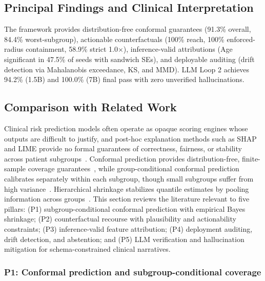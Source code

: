 \documentclass[11pt,a4paper]{article}
\theoremstyle{plain}
\begin{document}
\subsection{Principal Findings and Clinical Interpretation}
The framework provides distribution-free conformal guarantees (91.3\% overall, 84.4\% worst-subgroup), actionable counterfactuals (100\% reach, 100\% enforced-radius containment, 58.9\% strict 1.0$\times$), inference-valid attributions (Age significant in 47.5\% of seeds with sandwich SEs), and deployable auditing (drift detection via Mahalanobis exceedance, KS, and MMD). LLM Loop 2 achieves 94.2\% (1.5B) and 100.0\% (7B) final pass with zero unverified hallucinations.

\subsection{Comparison with Related Work}
\label{sec:related_work}

Clinical risk prediction models often operate as opaque scoring engines whose outputs are difficult to justify, and post-hoc explanation methods such as SHAP and LIME provide no formal guarantees of correctness, fairness, or stability across patient subgroups~\cite{wachter2017counterfactual, lundberg2017unified}. Conformal prediction provides distribution-free, finite-sample coverage guarantees~\cite{vovk2005algorithmic, shafer2008tutorial}, while group-conditional conformal prediction calibrates separately within each subgroup, though small subgroups suffer from high variance~\cite{lei2018distribution, melki2023group}. Hierarchical shrinkage stabilizes quantile estimates by pooling information across groups~\cite{dunn2023distribution}. This section reviews the literature relevant to five pillars: (P1) subgroup-conditional conformal prediction with empirical Bayes shrinkage; (P2) counterfactual recourse with plausibility and actionability constraints; (P3) inference-valid feature attribution; (P4) deployment auditing, drift detection, and abstention; and (P5) LLM verification and hallucination mitigation for schema-constrained clinical narratives.

\subsubsection{P1: Conformal prediction and subgroup-conditional coverage}
\end{document}
